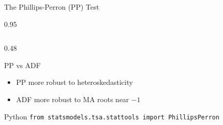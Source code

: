 \documentclass[9pt, aspectratio=169, t]{beamer}
\begin{document}
\begin{frame}{The Phillips-Perron (PP) Test}
\begin{cminipage}{0.95\textwidth}
\begin{columns}[T]
\begin{column}{0.48\textwidth}
\begin{exampleblock}{PP vs ADF}
\begin{itemize}
                        \item PP more robust to heteroskedasticity
                        \item ADF more robust to MA roots near $-1$
                    \end{itemize}
                \end{exampleblock}
                \vspace{-0.2cm}
                {\scriptsize
                \begin{alertblock}{Python}
                    \texttt{from statsmodels.tsa.stattools import PhillipsPerron}
                \end{alertblock}
                }
            \end{column}
        \end{columns}
    \end{cminipage}
\end{frame}
\end{document}
